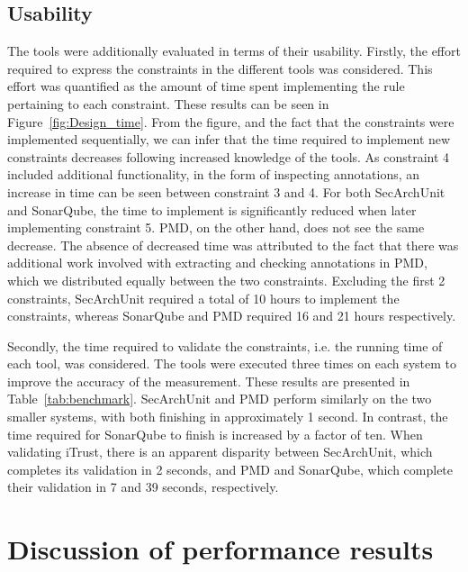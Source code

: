 \subsection{Usability}
The tools were additionally evaluated in terms of their usability. Firstly, the effort required to express the constraints in the different tools was considered. This effort was quantified as the amount of time spent implementing the rule pertaining to each constraint. These results can be seen in Figure~\ref{fig:Design_time}. From the figure, and the fact that the constraints were implemented sequentially, we can infer that the time required to implement new constraints decreases following increased knowledge of the tools. As constraint 4 included additional functionality, in the form of inspecting annotations, an increase in time can be seen between constraint 3 and 4. For both SecArchUnit and SonarQube, the time to implement is significantly reduced when later implementing constraint 5. PMD, on the other hand, does not see the same decrease. The absence of decreased time was attributed to the fact that there was additional work involved with extracting and checking annotations in PMD, which we distributed equally between the two constraints. Excluding the first 2 constraints, SecArchUnit required a total of 10 hours to implement the constraints, whereas SonarQube and PMD required 16 and 21 hours respectively. 



Secondly, the time required to validate the constraints, i.e. the running time of each tool, was considered. The tools were executed three times on each system to improve the accuracy of the measurement. These results are presented in Table~\ref{tab:benchmark}. SecArchUnit and PMD perform similarly on the two smaller systems, with both finishing in approximately 1 second. In contrast, the time required for SonarQube to finish is increased by a factor of ten. When validating iTrust, there is an apparent disparity between SecArchUnit, which completes its validation in 2 seconds, and PMD and SonarQube, which complete their validation in 7 and 39 seconds, respectively.





\section{Discussion of performance results}

